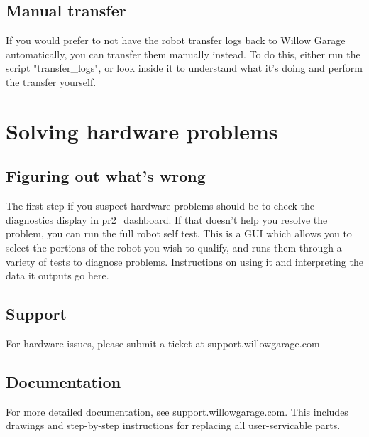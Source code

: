 \subsection{Manual transfer}
If you would prefer to not have the robot transfer logs back to Willow Garage automatically, you can transfer them manually instead.  To do this, either run the script "transfer\_logs", or look inside it to understand what it's doing and perform the transfer yourself.
\section{Solving hardware problems}
\subsection{Figuring out what's wrong}
The first step if you suspect hardware problems should be to check the diagnostics display in pr2\_dashboard.  If that doesn't help you resolve the problem, you can run the full robot self test.  This is a GUI which allows you to select the portions of the robot you wish to qualify, and runs them through a variety of tests to diagnose problems.  Instructions on using it and interpreting the data it outputs go here.
\subsection{Support}
For hardware issues, please submit a ticket at support.willowgarage.com
\subsection{Documentation}
For more detailed documentation, see support.willowgarage.com.  This includes drawings and step-by-step instructions for replacing all user-servicable parts.

